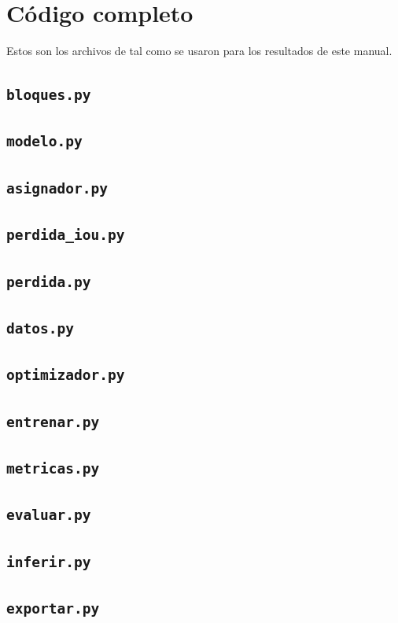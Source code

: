\chapter{Código completo}
\label{ap:codigo}

Estos son los archivos de  tal como se usaron
para los resultados de este manual.

\section{\texttt{bloques.py}}

\section{\texttt{modelo.py}}

\section{\texttt{asignador.py}}

\section{\texttt{perdida\_iou.py}}

\section{\texttt{perdida.py}}

\section{\texttt{datos.py}}

\section{\texttt{optimizador.py}}

\section{\texttt{entrenar.py}}

\section{\texttt{metricas.py}}

\section{\texttt{evaluar.py}}

\section{\texttt{inferir.py}}

\section{\texttt{exportar.py}}

